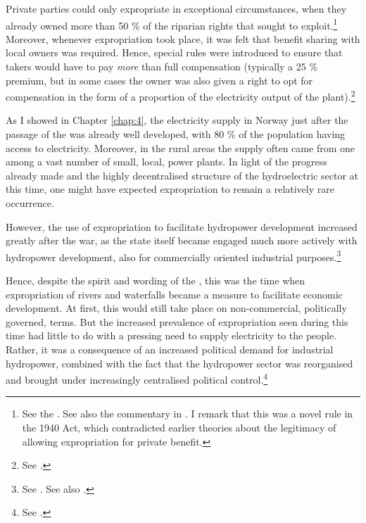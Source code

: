 Private parties could only expropriate in exceptional circumstances, when they already owned more than 50 \% of the riparian rights that sought to exploit.\footnote{See the \cite[55]{wra40}. See also the commentary in \cite[70-74]{sorensen41}. I remark that this was a novel rule in the 1940 Act, which contradicted earlier theories about the legitimacy of allowing expropriation for private benefit.} Moreover, whenever expropriation took place, it was felt that benefit sharing with local owners was required. Hence, special rules were introduced to ensure that takers would have to pay {\it more} than full compensation (typically a 25 \% premium, but in some cases the owner was also given a right to opt for compensation in the form of a proportion of the electricity output of the plant).\footnote{See \cite[70-91,184,210]{sorensen41}.}

As I showed in Chapter \ref{chap:4}, the electricity supply in Norway just after the passage of the \cite{wra40} was already well developed, with 80 \% of the population having access to electricity. Moreover, in the rural areas the supply often came from one among a vast number of small, local, power plants. In light of the progress already made and the highly decentralised structure of the hydroelectric sector at this time, one might have expected expropriation to remain a relatively rare occurrence.

However, the use of expropriation to facilitate hydropower development increased greatly after the war, as the state itself became engaged much more actively with hydropower development, also for commercially oriented industrial purposes.\footnote{See \cite[59-71]{thue96}. See also \cite{skjold06}.}

Hence, despite the spirit and wording of the \cite{wra40}, this was the time when expropriation of rivers and waterfalls became a measure to facilitate economic development. At first, this would still take place on non-commercial, politically governed, terms. But the increased prevalence of expropriation seen during this time had little to do with a pressing need to supply electricity to the people. Rather, it was a consequence of an increased political demand for industrial hydropower, combined with the fact that the hydropower sector was reorganised and brought under increasingly centralised political control.\footnote{See \cite[69-71]{thue96}.}

